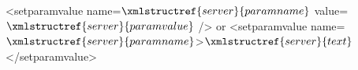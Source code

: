 <setparamvalue name=$\xmlstructref{server}{paramname}$ value=$\xmlstructref{server}{paramvalue}$ /> or
<setparamvalue name=$\xmlstructref{server}{paramname}$>$\xmlstructref{server}{text}$</setparamvalue>
